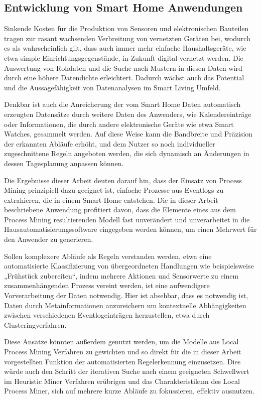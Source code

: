 \subsection{Entwicklung von Smart Home Anwendungen}
Sinkende Kosten für die Produktion von Sensoren und elektronischen Bauteilen tragen zur rasant wachsenden Verbreitung von vernetzten Geräten bei, wodurch es als wahrscheinlich gilt, dass auch immer mehr einfache Haushaltsgeräte, wie etwa simple Einrichtungsgegenstände, in Zukunft digital vernetzt werden. Die Auswertung von Rohdaten und die Suche nach Mustern in diesen Daten wird durch eine höhere Datendichte erleichtert. Dadurch wächst auch das Potential und die Aussagefähigkeit von Datenanalysen im Smart Living Umfeld.

Denkbar ist auch die Anreicherung der vom Smart Home Daten automatisch erzeugten Datensätze durch weitere Daten des Anwenders, wie Kalendereinträge oder Informationen, die durch andere elektronische Geräte wie etwa Smart Watches, gesammelt werden. Auf diese Weise kann die Bandbreite und Präzision der erkannten Abläufe erhöht, und dem Nutzer so noch individueller zugeschnittene Regeln angeboten werden, die sich dynamisch an Änderungen in dessen Tagesplanung anpassen können.

Die Ergebnisse dieser Arbeit deuten darauf hin, dass der Einsatz von Process Mining prinzipiell dazu geeignet ist, einfache Prozesse aus Eventlogs zu extrahieren, die in einem Smart Home entstehen. Die in dieser Arbeit beschriebene Anwendung profitiert davon, dass die Elemente eines aus dem Process Mining resultierenden Modell fast unverändert und unverarbeitet in die Hausautomatisierungssoftware eingegeben werden können, um einen Mehrwert für den Anwender zu generieren. 

Sollen komplexere Abläufe als Regeln verstanden werden, etwa eine automatisierte Klassifizierung von übergeordneten Handlungen wie beispielsweise „Frühstück zubereiten“, indem mehrere Aktionen und Sensorwerte zu einem zusammenhängenden Prozess vereint werden, ist eine aufwendigere Vorverarbeitung der Daten notwendig. Hier ist absehbar, dass es notwendig ist, Daten durch Metainformationen anzureichern um kontextuelle Abhängigkeiten zwischen verschiedenen Eventlogeinträgen herzustellen, etwa durch Clusteringverfahren. 

Diese Ansätze könnten außerdem genutzt werden, um die Modelle aus Local Process Mining Verfahren zu gewichten und so direkt für die in dieser Arbeit vorgestellten Funktion der automatisierten Regelerkennung einzusetzen. Dies würde auch den Schritt der iterativen Suche nach einem geeigneten Schwellwert im Heuristic Miner Verfahren erübrigen und das Charakteristikum des Local Process Miner, sich auf mehrere kurze Abläufe zu fokussieren, effektiv ausnutzen.

